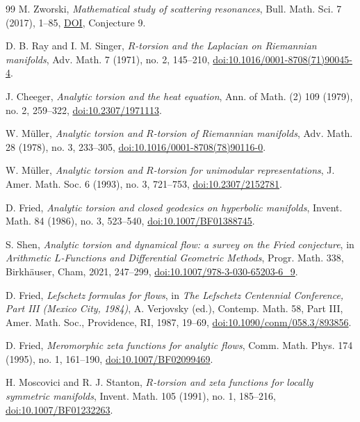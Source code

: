 \documentclass[11pt,letterpaper,reqno]{amsart}
\theoremstyle{remark}
\begin{document}
\begin{thebibliography}{99}
 M. Zworski,
\emph{Mathematical study of scattering resonances},
Bull. Math. Sci. 7 (2017), 1--85,
\href{https://doi.org/10.1007/s13373-017-0099-4}{DOI},
Conjecture 9.

 D. B. Ray and I. M. Singer,
\emph{$R$-torsion and the Laplacian on Riemannian manifolds},
Adv. Math. 7 (1971), no. 2, 145--210,
\href{https://doi.org/10.1016/0001-8708(71)90045-4}{doi:10.1016/0001-8708(71)90045-4}.

 J. Cheeger,
\emph{Analytic torsion and the heat equation},
Ann. of Math. (2) 109 (1979), no. 2, 259--322,
\href{https://doi.org/10.2307/1971113}{doi:10.2307/1971113}.

 W. M\"uller,
\emph{Analytic torsion and $R$-torsion of Riemannian manifolds},
Adv. Math. 28 (1978), no. 3, 233--305,
\href{https://doi.org/10.1016/0001-8708(78)90116-0}{doi:10.1016/0001-8708(78)90116-0}.

 W. M\"uller,
\emph{Analytic torsion and $R$-torsion for unimodular representations},
J. Amer. Math. Soc. 6 (1993), no. 3, 721--753,
\href{https://doi.org/10.2307/2152781}{doi:10.2307/2152781}.

 D. Fried,
\emph{Analytic torsion and closed geodesics on hyperbolic manifolds},
Invent. Math. 84 (1986), no. 3, 523--540,
\href{https://doi.org/10.1007/BF01388745}{doi:10.1007/BF01388745}.

 S. Shen,
\emph{Analytic torsion and dynamical flow: a survey on the Fried conjecture},
in \emph{Arithmetic $L$-Functions and Differential Geometric Methods},
Progr. Math. 338, Birkh\"auser, Cham, 2021, 247--299,
\href{https://doi.org/10.1007/978-3-030-65203-6_9}{doi:10.1007/978-3-030-65203-6\_9}.

 D. Fried,
\emph{Lefschetz formulas for flows}, in
\emph{The Lefschetz Centennial Conference, Part III (Mexico City, 1984)},
A. Verjovsky (ed.), Contemp. Math. 58, Part III,
Amer. Math. Soc., Providence, RI, 1987, 19--69,
\href{https://doi.org/10.1090/conm/058.3/893856}{doi:10.1090/conm/058.3/893856}.

 D. Fried,
\emph{Meromorphic zeta functions for analytic flows},
Comm. Math. Phys. 174 (1995), no. 1, 161--190,
\href{https://doi.org/10.1007/BF02099469}{doi:10.1007/BF02099469}.

 H. Moscovici and R. J. Stanton,
\emph{$R$-torsion and zeta functions for locally symmetric manifolds},
Invent. Math. 105 (1991), no. 1, 185--216,
\href{https://doi.org/10.1007/BF01232263}{doi:10.1007/BF01232263}.


\end{thebibliography}
\end{document}
